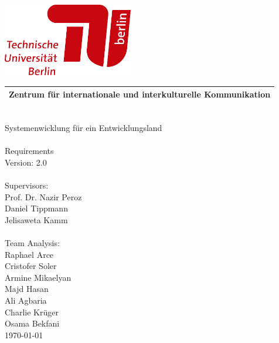 \documentclass[12pt, a4paper, headinclude, footinclude, plainfootsepline]{scrreprt}
\begin{document}
\pagecolor{darkblue}

\hspace*{2cm}\includegraphics[width=57mm]{../Pictures/TULogo}

\begin{tabularx}{\textwidth}{C}
\\
\hline
\color{skyblue} Zentrum für internationale und interkulturelle Kommunikation\\
\hline
\end{tabularx}
\vspace*{5cm}\\
\hspace*{3cm}\color{skyblue}\Huge Systemenwicklung für ein Entwicklungsland 
\\
\vspace*{0,7cm}\\
\hspace*{3cm}\Large Requirements\\
\hspace*{3cm}\small Version: 2.0
\\
\vspace*{3cm}\\
\hspace*{3cm}\Large Supervisors:
\\
{\normalsize
	\hspace*{3.5cm}Prof. Dr. Nazir Peroz\\
	\hspace*{3.5cm}Daniel Tippmann\\
	\hspace*{3.5cm}Jelisaweta Kamm\\
}
\vspace*{0.5cm}\\
\hspace*{3cm}\Large Team Analysis:\\
{\normalsize
	\hspace*{3.5cm}Raphael Arce\\
	\hspace*{3.5cm}Cristofer Soler\\
	\hspace*{3.5cm}Armine Mikaelyan\\
	\hspace*{3.5cm}Majd Hasan\\
	\hspace*{3.5cm}Ali Agbaria\\
	\hspace*{3.5cm}Charlie Krüger\\
	\hspace*{3.5cm}Osama Bekfani\\
}
\hspace*{14cm}\large \today
\end{document}

